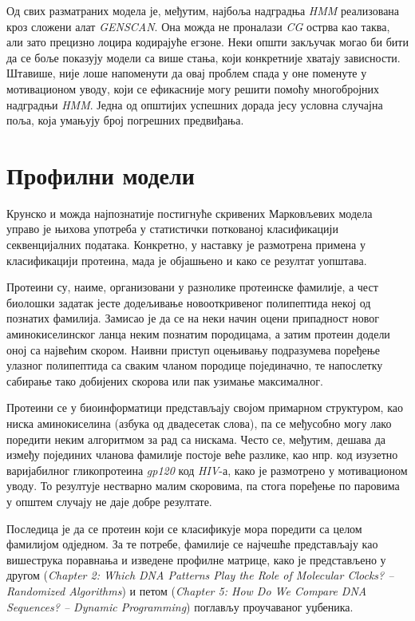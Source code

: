 \documentclass[12pt,oneside]{memoir}
\begin{document}
\begin{CJK}{UTF8}{ipxm}
Од свих разматраних модела је, међутим, најбоља надградња \textit{HMM} реализована кроз сложени алат \textit{GENSCAN}. Она можда не проналази \textit{CG} острва као таква, али зато прецизно лоцира кодирајуће егзоне. Неки општи закључак могао би бити да се боље показују модели са више стања, који конкретније хватају зависности. Штавише, није лоше напоменути да овај проблем спада у оне поменуте у мотивационом уводу, који се ефикасније могу решити помоћу многобројних надградњи \textit{HMM}. Једна од општијих успешних дорада јесу условна случајна поља, која умањују број погрешних предвиђања\cite{culotta2005, decaprio2007}.

\section{Профилни модели}
Крунско и можда најпознатије постигнуће скривених Марковљевих модела управо је њихова употреба у статистички поткованој класификацији секвенцијалних података. Конкретно, у наставку је размотрена примена у класификацији протеина, мада је објашњено и како се резултат уопштава.

Протеини су, наиме, организовани у разнолике протеинске фамилије, а чест биолошки задатак јесте додељивање новооткривеног полипептида некој од познатих фамилија. Замисао је да се на неки начин оцени припадност новог аминокиселинског ланца неким познатим породицама, а затим протеин додели оној са највећим скором. Наивни приступ оцењивању подразумева поређење улазног полипептида са сваким чланом породице појединачно, те напослетку сабирање тако добијених скорова или пак узимање максималног.

Протеини се у биоинформатици представљају својом примарном структуром, као ниска аминокиселина (азбука од двадесетак слова), па се међусобно могу лако поредити неким алгоритмом за рад са нискама. Често се, међутим, дешава да између појединих чланова фамилије постоје веће разлике, као нпр. код изузетно варијабилног гликопротеина \textit{gp120} код \textit{HIV}-а, како је размотрено у мотивационом уводу. То резултује нестварно малим скоровима, па стога поређење по паровима у општем случају не даје добре резултате.

Последица је да се протеин који се класификује мора поредити са целом фамилијом одједном. За те потребе, фамилије се најчешће представљају као вишеструка поравнања и изведене профилне матрице, како је представљено у другом (\textit{Chapter 2: Which DNA Patterns Play the Role of Molecular Clocks? -- Randomized Algorithms}) и петом (\textit{Chapter 5: How Do We Compare DNA Sequences? -- Dynamic Programming}) поглављу проучаваног уџбеника.


\end{CJK}
\end{document}
